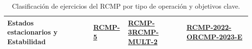 \begin{table}[H]
{\begin{tabular}{|p{4.5cm}|p{2.5cm}|p{3.0cm}|p{3.0cm}|p{3.5cm}|}
			\hline
			\textbf{Estados estacionarios y Estabilidad}                                  &
			                                                                              &
			\hyperlink{qs:RCMP-5}{RCMP-5}                                                 &
			\hyperlink{qs:RCMP-3}{RCMP-3}\newline \hyperlink{qs:RCMP-MULT-2}{RCMP-MULT-2} &
			\hyperlink{qs:RCMP-2022-O}{RCMP-2022-O}\newline \hyperlink{qs:RCMP-2023-E}{RCMP-2023-E}                                                                                                                                                                                                                         \\
			\hline
		\end{tabular}
	}
	\caption{Clasificación de ejercicios del RCMP por tipo de operación y objetivos clave.}
	\label{tab:clasificacion_rcmp}
\end{table}
\vspace{1em}


